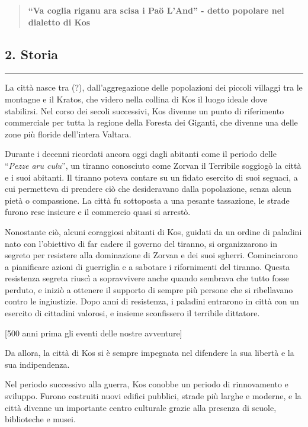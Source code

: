 \begin{quote}
\textbf{``Va coglia riganu ara scisa i Paö L'And'' - detto popolare nel
dialetto di Kos}
\end{quote}

\subsection{2. Storia}\label{storia}

\begin{center}\rule{0.5\linewidth}{0.5pt}\end{center}

La città nasce tra (?), dall'aggregazione delle popolazioni dei piccoli
villaggi tra le montagne e il Kratos, che videro nella collina di Kos il
luogo ideale dove stabilirsi. Nel corso dei secoli successivi, Kos
divenne un punto di riferimento commerciale per tutta la regione della
Foresta dei Giganti, che divenne una delle zone più floride dell'intera
Valtara.

Durante i decenni ricordati ancora oggi dagli abitanti come il periodo
delle ``\emph{Pezze aru culu}'', un tiranno conosciuto come Zorvan il
Terribile soggiogò la città e i suoi abitanti. Il tiranno poteva contare
su un fidato esercito di suoi seguaci, a cui permetteva di prendere ciò
che desideravano dalla popolazione, senza alcun pietà o compassione. La
città fu sottoposta a una pesante tassazione, le strade furono rese
insicure e il commercio quasi si arrestò.

Nonostante ciò, alcuni coraggiosi abitanti di Kos, guidati da un ordine
di paladini nato con l'obiettivo di far cadere il governo del tiranno,
si organizzarono in segreto per resistere alla dominazione di Zorvan e
dei suoi sgherri. Cominciarono a pianificare azioni di guerriglia e a
sabotare i rifornimenti del tiranno. Questa resistenza segreta riuscì a
sopravvivere anche quando sembrava che tutto fosse perduto, e iniziò a
ottenere il supporto di sempre più persone che si ribellavano contro le
ingiustizie. Dopo anni di resistenza, i paladini entrarono in città con
un esercito di cittadini valorosi, e insieme sconfissero il terribile
dittatore.

{[}500 anni prima gli eventi delle nostre avventure{]}

Da allora, la città di Kos si è sempre impegnata nel difendere la sua
libertà e la sua indipendenza.

Nel periodo successivo alla guerra, Kos conobbe un periodo di
rinnovamento e sviluppo. Furono costruiti nuovi edifici pubblici, strade
più larghe e moderne, e la città divenne un importante centro culturale
grazie alla presenza di scuole, biblioteche e musei.


